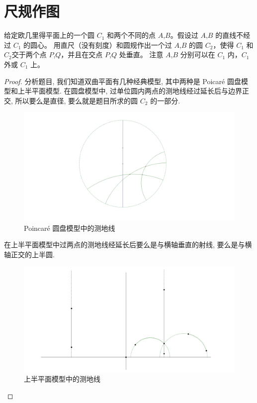 \chapter{尺规作图}
\begin{problem}
    给定欧几里得平面上的一个圆 $C_1$ 和两个不同的点 $A$,$B$。假设过 $A$,$B$ 的直线不经过 $C_1$ 的圆心。
    用直尺（没有刻度）和圆规作出一个过 $A$,$B$ 的圆 $C_2$，使得 $C_1$ 和 $C_2$交于两个点 $P$,$Q$，并且在交点 $P$,$Q$ 处垂直。
    注意 $A$,$B$ 分别可以在 $C_1$ 内，$C_1$ 外或 $C_1$ 上。
\end{problem}
\begin{proof}
    分析题目, 我们知道双曲平面有几种经典模型, 其中两种是 Poicar\'e 圆盘模型和上半平面模型. 在圆盘模型中, 过单位圆内两点的测地线经过延长后与边界正交, 所以要么是直径,
    要么就是题目所求的圆 $C_2$ 的一部分.
    \begin{figure}[htbp]
        \centering
        \includegraphics[scale = 0.18]{Figures/geo-in-D2.png}
        \caption{Poincar\'e 圆盘模型中的测地线}
    \end{figure}

    在上半平面模型中过两点的测地线经延长后要么是与横轴垂直的射线, 要么是与横轴正交的上半圆. 
    \begin{figure}[htbp]
        \centering
        \includegraphics[scale = 0.2]{Figures/geo-in-H2.png}
        \caption{上半平面模型中的测地线}
    \end{figure}


\end{proof}
